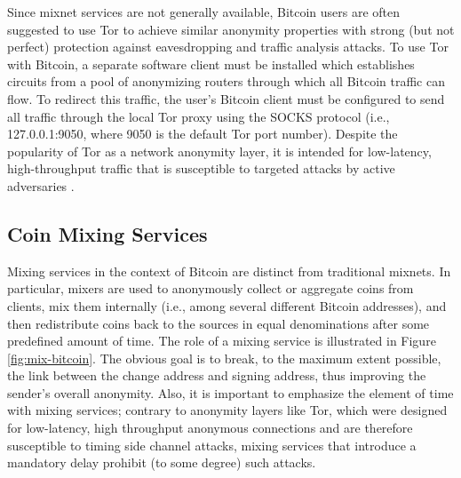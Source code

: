 Since mixnet services are not generally available, Bitcoin users are often suggested to use Tor \cite{tor} to achieve similar anonymity properties with strong (but not perfect) protection against eavesdropping and traffic analysis attacks. To use Tor with Bitcoin, a separate software client must be installed which establishes circuits from a pool of anonymizing routers through which all Bitcoin traffic can flow. To redirect this traffic, the user's Bitcoin client must be configured to send all traffic through the local Tor proxy using the SOCKS protocol (i.e., 127.0.0.1:9050, where 9050 is the default Tor port number). Despite the popularity of Tor as a network anonymity layer, it is intended for low-latency, high-throughput traffic that is susceptible to targeted attacks by active adversaries \cite{tor-attack1,tor-attack2}.  



\subsection{Coin Mixing Services}
Mixing services in the context of Bitcoin are distinct from traditional mixnets. In particular, mixers are used to anonymously collect or aggregate coins from clients, mix them internally (i.e., among several different Bitcoin addresses), and then redistribute coins back to the sources in equal denominations after some predefined amount of time. The role of a mixing service is illustrated in Figure \ref{fig:mix-bitcoin}. The obvious goal is to break, to the maximum extent possible, the link between the change address and signing address, thus improving the sender's overall anonymity. Also, it is important to emphasize the element of time with mixing services; contrary to anonymity layers like Tor, which were designed for low-latency, high throughput anonymous connections and are therefore susceptible to timing side channel attacks, mixing services that introduce a mandatory delay prohibit (to some degree) such attacks.

